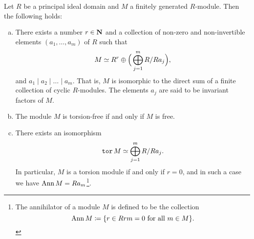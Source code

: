 \begin{theorem}
\label{thm:fundamental-theorem-of-invariant-factors}
Let \(R\) be a principal ideal domain and \(M\) a finitely generated
\(R\)-module. Then the following holds:
\begin{enumerate}[(a)]\setlength\itemsep{0em}
\item There exists a number \(r \in \mathbf{N}\) and a collection of non-zero and
  non-invertible elements \((a_1, \dots, a_m)\) of \(R\) such that
  \[
  M \simeq R^r \oplus \Big( \bigoplus_{j=1}^m R/R a_j \Big),
  \]
  and \(a_1 \mid a_2 \mid \dots \mid a_m\). That is, \(M\) is isomorphic to the
  direct sum of a finite collection of cyclic \(R\)-modules. The elements
  \(a_j\) are said to be invariant factors of \(M\).

\item The module \(M\) is torsion-free if and only if \(M\) is free.

\item There exists an isomorphism
  \[
  \operatorname{\texttt{tor}} M \simeq \bigoplus_{j=1}^m R/Ra_j.
  \]
  In particular, \(M\) is a torsion module if and only if \(r = 0\), and in such
  a case we have \(\operatorname{Ann} M = R a_m\)\footnote{The annihilator of a module \(M\)
    is defined to be the collection
    \[
    \operatorname{Ann} M \coloneq \{r \in R \relax r m = 0 \text{ for all } m \in M\}.
    \]}.
\end{enumerate}
\end{theorem}

